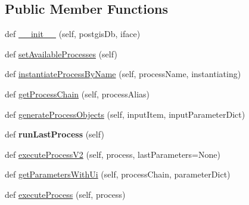 \subsection*{Public Member Functions}
\begin{DoxyCompactItemize}
\item 
def \mbox{\hyperlink{class_dsg_tools_1_1_validation_tools_1_1validation_manager_1_1_validation_manager_a243f2909a5d134f7ed62cc2d7e6dc73c}{\+\_\+\+\_\+init\+\_\+\+\_\+}} (self, postgis\+Db, iface)
\item 
def \mbox{\hyperlink{class_dsg_tools_1_1_validation_tools_1_1validation_manager_1_1_validation_manager_a6e35072e219132f123b62f26620097e5}{set\+Available\+Processes}} (self)
\item 
def \mbox{\hyperlink{class_dsg_tools_1_1_validation_tools_1_1validation_manager_1_1_validation_manager_ac3667c7214510a01bb6fa1b3825de13d}{instantiate\+Process\+By\+Name}} (self, process\+Name, instantiating)
\item 
def \mbox{\hyperlink{class_dsg_tools_1_1_validation_tools_1_1validation_manager_1_1_validation_manager_a533bfcc682ca85c822147162426db5bd}{get\+Process\+Chain}} (self, process\+Alias)
\item 
def \mbox{\hyperlink{class_dsg_tools_1_1_validation_tools_1_1validation_manager_1_1_validation_manager_add0d3a87de62da336d733cf3b1aae3b4}{generate\+Process\+Objects}} (self, input\+Item, input\+Parameter\+Dict)
\item 
\mbox{\label{class_dsg_tools_1_1_validation_tools_1_1validation_manager_1_1_validation_manager_a45a28c954a955ef73f86f05e958ebc61}} 
def {\bfseries run\+Last\+Process} (self)
\item 
def \mbox{\hyperlink{class_dsg_tools_1_1_validation_tools_1_1validation_manager_1_1_validation_manager_a2d8658908b9fd7f171aefa0dc4a617a3}{execute\+Process\+V2}} (self, process, last\+Parameters=None)
\item 
def \mbox{\hyperlink{class_dsg_tools_1_1_validation_tools_1_1validation_manager_1_1_validation_manager_aaba55832ad4846f8009124924c5b3cca}{get\+Parameters\+With\+Ui}} (self, process\+Chain, parameter\+Dict)
\item 
def \mbox{\hyperlink{class_dsg_tools_1_1_validation_tools_1_1validation_manager_1_1_validation_manager_af0cb4ad437c9307e43d2fdf837ae6284}{execute\+Process}} (self, process)
\end{DoxyCompactItemize}
